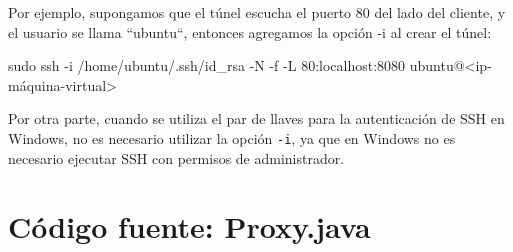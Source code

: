 Por ejemplo, supongamos que el túnel escucha el puerto 80 del lado del cliente, y el usuario se llama ``ubuntu``, entonces agregamos la opción -i al crear el túnel:

\begin{SourceCode}
sudo ssh -i /home/ubuntu/.ssh/id_rsa -N -f -L 80:localhost:8080 ubuntu@<ip-máquina-virtual>
\end{SourceCode}

Por otra parte, cuando se utiliza el par de llaves para la autenticación de SSH en Windows, no es necesario utilizar la opción \texttt{-i}, ya que en Windows no es necesario ejecutar SSH con permisos de administrador.

\chapter{Código fuente: Proxy.java}
